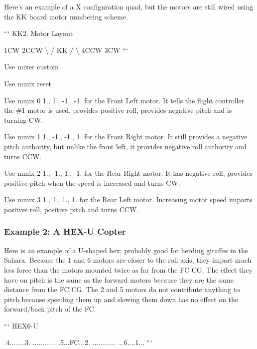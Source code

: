 Here's an example of a X configuration quad, but the motors are still wired using the K\+K board motor numbering scheme.

``` K\+K2. Motor Layout

1\+C\+W 2\+C\+C\+W \textbackslash{} / K\+K / \textbackslash{} 4\+C\+C\+W 3\+C\+W ```


\begin{DoxyEnumerate}
\item Use {\ttfamily mixer custom}
\item Use {\ttfamily mmix reset}
\item Use {\ttfamily mmix 0 1., 1., -\/1., -\/1.} for the Front Left motor. It tells the flight controller the \#1 motor is used, provides positive roll, provides negative pitch and is turning C\+W.
\item Use {\ttfamily mmix 1 1., -\/1., -\/1., 1.} for the Front Right motor. It still provides a negative pitch authority, but unlike the front left, it provides negative roll authority and turns C\+C\+W.
\item Use {\ttfamily mmix 2 1., -\/1., 1., -\/1.} for the Rear Right motor. It has negative roll, provides positive pitch when the speed is increased and turns C\+W.
\item Use {\ttfamily mmix 3 1., 1., 1., 1.} for the Rear Left motor. Increasing motor speed imparts positive roll, positive pitch and turns C\+C\+W.
\end{DoxyEnumerate}

\subsubsection*{Example 2\+: A H\+E\+X-\/\+U Copter}

Here is an example of a U-\/shaped hex; probably good for herding giraffes in the Sahara. Because the 1 and 6 motors are closer to the roll axis, they impart much less force than the motors mounted twice as far from the F\+C C\+G. The effect they have on pitch is the same as the forward motors because they are the same distance from the F\+C C\+G. The 2 and 5 motors do not contribute anything to pitch because speeding them up and slowing them down has no effect on the forward/back pitch of the F\+C.

``` H\+E\+X6-\/\+U

.4........3. ............ .5...F\+C...2. ............ ...6....1... ```

